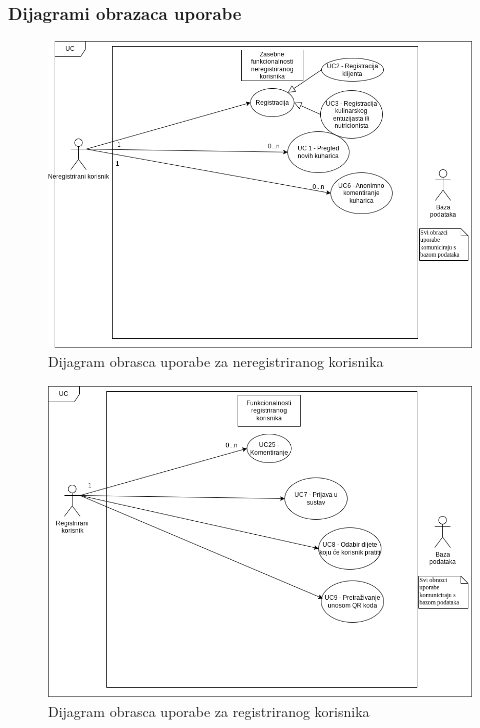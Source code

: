 					
				\subsubsection{Dijagrami obrazaca uporabe}
					\begin{figure}[H]
						\centering
						\includegraphics[scale=0.5]{dijagrami/dijagram-obrazaca-uporabe-neregistriranog-korisnika.png}
						\caption{Dijagram obrasca uporabe za neregistriranog korisnika}
						\label{fig:uc-neregistrirani}
					\end{figure}
					\begin{figure}[H]
						\centering
						\includegraphics[scale=0.5]{dijagrami/dijagram-obrazaca-uporabe-registriranog-korisnika.png}
						\caption{Dijagram obrasca uporabe za registriranog korisnika}
						\label{fig:uc-registrirani}
					\end{figure} 

